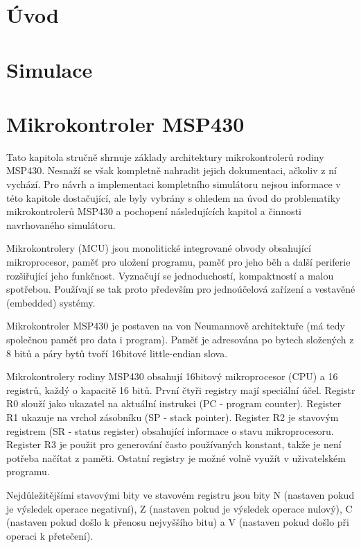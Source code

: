 
\chapter{Úvod}

\chapter{Simulace}

\chapter{Mikrokontroler MSP430}

Tato kapitola stručně shrnuje základy architektury mikrokontrolerů rodiny MSP430. Nesnaží se však kompletně nahradit jejich dokumentaci, ačkoliv z ní vychází. Pro návrh a implementaci kompletního simulátoru nejsou informace v této kapitole dostačující, ale byly vybrány s ohledem na úvod do problematiky mikrokontrolerů MSP430 a pochopení následujících kapitol a činnosti navrhovaného simulátoru.

Mikrokontrolery (MCU) jsou monolitické integrované obvody obsahující mikroprocesor, paměť pro uložení programu, paměť pro jeho běh a další periferie
rozšiřující jeho funkčnost. Vyznačují se jednoduchostí, kompaktností a malou spotřebou. Používají se tak proto především pro jednoúčelová zařízení a 
vestavěné (embedded) systémy.

Mikrokontroler MSP430 je postaven na von Neumannově architektuře (má tedy společnou paměť pro data i program). Paměť je adresována po bytech složených z 8 bitů a páry bytů tvoří 16bitové little-endian slova.

Mikrokontrolery rodiny MSP430 obsahují 16bitový mikroprocesor (CPU) a 16 registrů, každý o kapacitě 16 bitů. První čtyři registry mají speciální účel. Registr R0 slouží jako ukazatel na aktuální instrukci (PC - program counter). Register R1 ukazuje na vrchol zásobníku (SP - stack pointer). Register R2 je stavovým registrem (SR - status register) obsahující informace o stavu mikroprocesoru. Register R3 je použit pro generování často používaných konstant, takže je není potřeba načítat z paměti. Ostatní registry je možné volně využít v uživatelském programu.

Nejdůležitějšími stavovými bity ve stavovém registru jsou bity N (nastaven pokud je výsledek operace negativní), Z (nastaven pokud je výsledek operace nulový), C (nastaven pokud došlo k přenosu nejvyššího bitu) a V (nastaven pokud došlo při operaci k přetečení).

